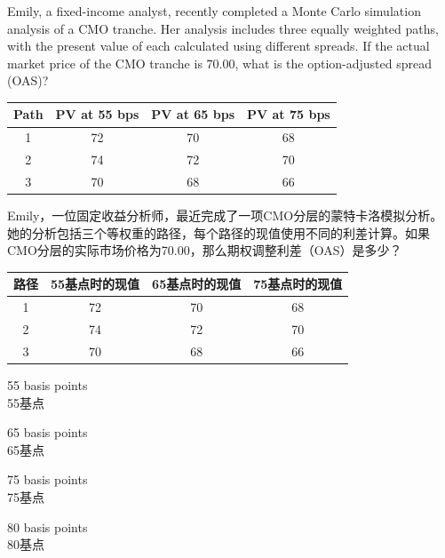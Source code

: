 \documentclass{article}
\newcounter{question} %
\begin{document}
\begin{question}
    Emily, a fixed-income analyst, recently completed a Monte Carlo simulation analysis of a CMO tranche. Her analysis includes three equally weighted paths, with the present value of each calculated using different spreads. If the actual market price of the CMO tranche is 70.00, what is the option-adjusted spread (OAS)?
    \begin{center}
        \begin{tabular}{|c|c|c|c|}
        \hline
        \textbf{Path} & \textbf{PV at 55 bps} & \textbf{PV at 65 bps} & \textbf{PV at 75 bps} \\
        \hline
        1 & 72 & 70 & 68 \\
        2 & 74 & 72 & 70 \\
        3 & 70 & 68 & 66 \\
        \hline
        \end{tabular}
        \end{center}
        Emily，一位固定收益分析师，最近完成了一项CMO分层的蒙特卡洛模拟分析。她的分析包括三个等权重的路径，每个路径的现值使用不同的利差计算。如果CMO分层的实际市场价格为70.00，那么期权调整利差（OAS）是多少？
        \begin{center}
            \begin{tabular}{|c|c|c|c|}
            \hline
            \textbf{路径} & \textbf{55基点时的现值} & \textbf{65基点时的现值} & \textbf{75基点时的现值} \\
            \hline
            1 & 72 & 70 & 68 \\
            2 & 74 & 72 & 70 \\
            3 & 70 & 68 & 66 \\
            \hline
            \end{tabular}
            \end{center}
    \end{question}
    
    \begin{choices}
        \item 55 basis points\\
        55基点
        \item 65 basis points\\
        65基点
        \item 75 basis points\\
        75基点
        \item 80 basis points\\
        80基点
    \end{choices}
    
\end{document}
